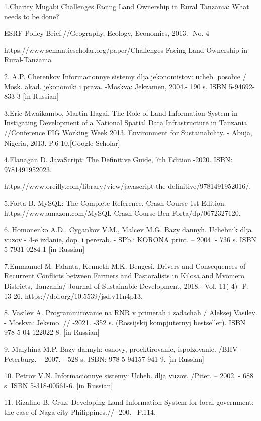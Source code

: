 \begin{noparindent}
1.Charity Mugabi Challenges Facing Land Ownership in Rural Tanzania:
What needs to be done?

ESRF Policy Brief.//Geography, Ecology, Economics, 2013.- No. 4

https://www.semanticscholar.org/paper/Challenges-Facing-Land-Ownership-in-Rural-Tanzania

2. A.P. Cherenkov Informacionnye sistemy dlja jekonomistov: ucheb.
posobie / Mosk. akad. jekonomiki i prava. -Moskva: Jekzamen, 2004.- 190
s. ISBN 5-94692-833-3 {[}in Russian{]}

3.Eric Mwaikambo, Martin Hagai. The Role of Land Information System in
Instigating Development of a National Spatial Data Infrastructure in
Tanzania //Conference FIG Working Week 2013. Environment for
Sustainability. - Abuja, Nigeria, 2013.-P.6-10.{[}Google Scholar{]}

4.Flanagan D. JavaScript: The Definitive Guide, 7th Edition.-2020. ISBN:
9781491952023.

https://www.oreilly.com/library/view/javascript-the-definitive/9781491952016/.

5.Forta B. MySQL: The Complete Reference. Crash Course 1st Edition.
https://www.amazon.com/MySQL-Crash-Course-Ben-Forta/dp/0672327120.

6. Homonenko A.D., Cygankov V.M., Mal\textquotesingle cev M.G. Bazy
dannyh. Uchebnik dlja vuzov - 4-e izdanie, dop. i pererab. - SPb.:
KORONA print. -- 2004. - 736 s. ISBN 5-7931-0284-1 {[}in Russian{]}

7.Emmanuel M. Falanta, Kenneth M.K. Bengesi. Drivers and Consequences of
Recurrent Conflicts between Farmers and Pastoralists in Kilosa and
Mvomero Districts, Tanzania/ Journal of Sustainable Development, 2018.-
Vol. 11( 4) -P. 13-26. https://doi.org/10.5539/jsd.v11n4p13. \hl{}

8. Vasil\textquotesingle ev A. Programmirovanie na RNR v primerah i
zadachah / Aleksej Vasil\textquotesingle ev. - Moskva: Jeksmo. // -2021.
-352 s. (Rossijskij komp\textquotesingle juternyj bestseller). ISBN
978-5-04-122022-8. {[}in Russian{]}

9. Malyhina M.P. Bazy dannyh: osnovy, proektirovanie,
ispol\textquotesingle zovanie. /BHV-Peterburg. -- 2007. - 528 s. ISBN:
978-5-94157-941-9. {[}in Russian{]}

10. Petrov V.N. Informacionnye sistemy: Ucheb. dlja vuzov. /Piter. --
2002. - 688 s. ISBN 5-318-00561-6. {[}in Russian{]}

11. Rizalino B. Cruz. Developing Land Information System for local
government: the case of Naga city Philippines.// -200. --P.114.


\end{noparindent}
